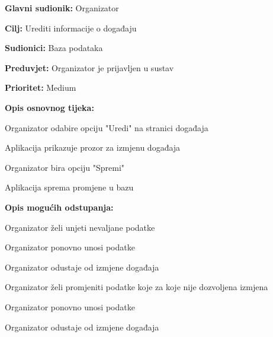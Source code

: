 \noindent {}
	\begin{packed_item}
		
		\item \textbf{Glavni sudionik:} Organizator
		\item \textbf{Cilj:} Urediti informacije o događaju
		\item \textbf{Sudionici:} Baza podataka
		\item \textbf{Preduvjet:} Organizator je prijavljen u sustav
		\item \textbf{Prioritet:} Medium
		\item \textbf{Opis osnovnog tijeka:} 
		
		\item[] \begin{packed_enum}
			
			\item Organizator odabire opciju "Uredi" na stranici događaja
			\item Aplikacija prikazuje prozor za izmjenu događaja
			\item Organizator bira opciju "Spremi"
			\item Aplikacija sprema promjene u bazu
		\end{packed_enum}
	
		\item  \textbf{Opis mogućih odstupanja:}
		\item[] \begin{packed_item}
			
			\item[3.a] Organizator želi unjeti nevaljane podatke
			\item[] \begin{packed_enum}
				\item Organizator ponovno unosi podatke
				\item Organizator odustaje od izmjene događaja
			\end{packed_enum}
		
			\item[3.b] Organizator želi promjeniti podatke koje za koje nije dozvoljena izmjena
			\item[] \begin{packed_enum}
				\item Organizator ponovno unosi podatke
				\item Organizator odustaje od izmjene događaja
			\end{packed_enum}
			
		\end{packed_item}
	\end{packed_item}
				
